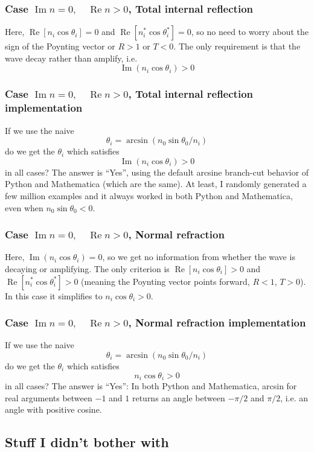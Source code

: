 \documentclass[12pt]{article}
\renewcommand{\(}{\left(}
\renewcommand{\)}{\right)}
\renewcommand{\Im}{\operatorname{Im}}
\renewcommand{\Re}{\operatorname{Re}}
\begin{document}
\subsubsection{Case $\Im n=0, \quad \Re n > 0$, Total internal reflection}
Here, $\Re[n_i \cos\theta_i] = 0$ and $\Re [n_i^* \cos \theta_i^*]=0$, so no need to worry about the sign of the Poynting vector or $R>1$ or $T<0$. The only requirement is that the wave decay rather than amplify, i.e.
$$\Im(n_i \cos \theta_i)>0$$

\subsubsection{Case $\Im n=0, \quad \Re n > 0$, Total internal reflection implementation}
If we use the naive
$$\theta_i = \arcsin(n_0 \sin \theta_0 / n_i)$$
do we get the $\theta_i$ which satisfies
$$\Im(n_i \cos \theta_i)>0$$
in all cases? The answer is ``Yes'', using the default arcsine branch-cut behavior of Python and Mathematica (which are the same). At least, I randomly generated a few million examples and it always worked in both Python and Mathematica, even when $n_0\sin\theta_0<0$.

\subsubsection{Case $\Im n=0, \quad \Re n > 0$, Normal refraction}

Here, $\Im(n_i \cos \theta_i)=0$, so we get no information from whether the wave is decaying or amplifying. The only criterion is $\Re[n_i \cos\theta_i] > 0$ and $\Re [n_i^* \cos \theta_i^*]>0$ (meaning the Poynting vector points forward, $R<1$, $T>0$). In this case it simplifies to $n_i \cos\theta_i > 0$.

\subsubsection{Case $\Im n=0, \quad \Re n > 0$, Normal refraction implementation}
If we use the naive
$$\theta_i = \arcsin(n_0 \sin \theta_0 / n_i)$$
do we get the $\theta_i$ which satisfies
$$n_i \cos \theta_i>0$$
in all cases? The answer is ``Yes'': In both Python and Mathematica, arcsin for real arguments between $-1$ and $1$ returns an angle between $-\pi/2$ and $\pi/2$, i.e. an angle with positive cosine.

\subsection{Stuff I didn't bother with}
\end{document}
